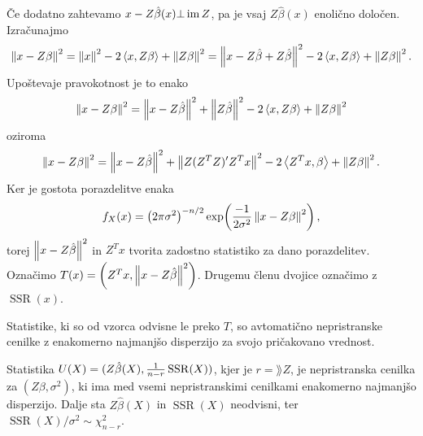 Če dodatno zahtevamo $x - Z \hat{\beta}(x) \bot \operatorname{im} Z$, pa je vsaj $Z
\hat{\beta}(x)$ enolično določen.
Izračunajmo
\[
  \left\lVert x - Z \beta\right\rVert^2
  = \left\lVert x\right\rVert^2 - 2 \left< x, Z \beta \right> + \left\lVert Z \beta\right\rVert^2
  = \left\lVert x - Z \hat{\beta} + Z \hat{\beta}\right\rVert^2 - 2 \left< x, Z \beta \right> + \left\lVert Z
	\beta\right\rVert^2.
\]
Upoštevaje pravokotnost je to enako
\[
  \left\lVert x - Z \beta\right\rVert^2
  = \left\lVert x - Z \hat{\beta}\right\rVert^2 + \left\lVert Z \hat{\beta}\right\rVert^2 - 2 \left< x, Z \beta \right> +
  \left\lVert Z \beta\right\rVert^2
\]
oziroma
\[
  \left\lVert x - Z \beta\right\rVert^2
  = \left\lVert x - Z \hat{\beta}\right\rVert^2 + \left\lVert Z (Z^T Z)' Z^T x\right\rVert^2 - 2 \left< Z^T x, \beta \right>
  + \left\lVert Z \beta\right\rVert^2.
\]
Ker je gostota porazdelitve enaka
\[
  f_X(x) = \left( 2 \pi \sigma^2 \right)^{-n/2} \exp\!\left( \frac{-1}{2
	  \sigma^2} \left\lVert x - Z \beta\right\rVert^2 \right),
\]
torej $\left\lVert x - Z \hat{\beta}\right\rVert^2$ in $Z^T x$ tvorita zadostno statistiko za
dano porazdelitev.
Označimo $T(x) = \left(Z^T x, \left\lVert x - Z \hat{\beta}\right\rVert^2 \right)$.
Drugemu členu dvojice označimo z $\operatorname{SSR}(x)$.

\begin{posledica}
  Statistike, ki so od vzorca odvisne le preko $T$, so avtomatično nepristranske
  cenilke z enakomerno najmanjšo disperzijo za svojo pričakovano vrednost.
\end{posledica}

\begin{izrek}
  Statistika $U(X) = (Z \hat{\beta}(X), \frac{1}{n-r} \operatorname{SSR}(X))$, kjer
  je $r = \rang Z$, je nepristranska cenilka za $(Z \beta, \sigma^2)$, ki ima
  med vsemi nepristranskimi cenilkami enakomerno najmanjšo disperzijo.
  Dalje sta $Z \hat{\beta}(X)$ in $\operatorname{SSR}(X)$ neodvisni, ter
  $\operatorname{SSR}(X) / \sigma^2 \sim \chi_{n-r}^2$.
\end{izrek}

